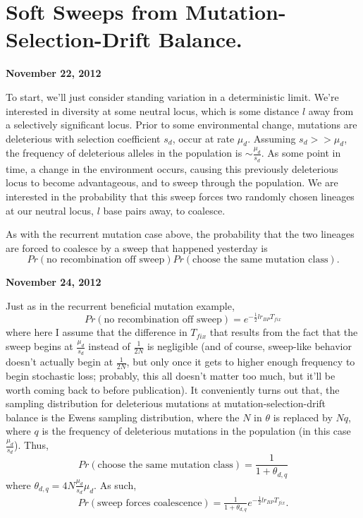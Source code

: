 \documentclass[reqno]{amsart}
\begin{document}
\newpage
\section*{Soft Sweeps from Mutation-Selection-Drift Balance.} 

\begin{flushright}
	\textbf{November 22, 2012}
\end{flushright}
To start, we'll just consider standing variation in a deterministic limit. We're interested in diversity at some neutral locus, which is some distance $l$ away from a selectively significant locus. Prior to some environmental change, mutations are deleterious with selection coefficient $s_d$, occur at rate $\mu_d$. Assuming $s_d>>\mu_d$, the frequency of deleterious alleles in the population is $\sim \frac{\mu_d}{s_d}$. As some point in time, a change in the environment occurs, causing this previously deleterious locus to become advantageous, and to sweep through the population. We are interested in the probability that this sweep forces two randomly chosen lineages at our neutral locus, $l$ base pairs away, to coalesce.

As with the recurrent mutation case above, the probability that the two lineages are forced to coalesce by a sweep that happened yesterday is
	$$Pr(\text{no recombination off sweep})Pr(\text{choose the same mutation class}).$$

\begin{flushright}
	\textbf{November 24, 2012}
\end{flushright}

Just as in the recurrent beneficial mutation example, 
\begin{equation}
	Pr(\text{no recombination off sweep}) = e^{-\frac{1}{2}lr_{BP}T_{fix}}
\end{equation}
where here I assume that the difference in $T_{fix}$ that results from the fact that the sweep begins at $\frac{\mu_d}{s_d}$ instead of $\frac{1}{2N}$ is negligible (and of course, sweep-like behavior doesn't actually begin at $\frac{1}{2N}$, but only once it gets to higher enough frequency to begin stochastic loss; probably, this all doesn't matter too much, but it'll be worth coming back to before publication). It conveniently turns out that, the sampling distribution for deleterious mutations at mutation-selection-drift balance is the Ewens sampling distribution,\cite{Ewens1972} where the $N$ in $\theta$ is replaced by $Nq$, where $q$ is the frequency of deleterious mutations in the population\cite{Hartl1982,Slatkin1997,Wakeley2008} (in this case $\frac{\mu_d}{s_d}$). Thus, 
\begin{equation}
	Pr(\text{choose the same mutation class}) = \frac{1}{1+\theta_{d,q}}
\end{equation}
where $\theta_{d,q} = 4N\frac{\mu_d}{s_d}\mu_d.$ As such,
\begin{align}
	Pr(\text{sweep forces coalescence}) = \frac{1}{1+\theta_{d,q}}e^{-\frac{1}{2}lr_{BP}T_{fix}}.
\end{align} 
\end{document}
